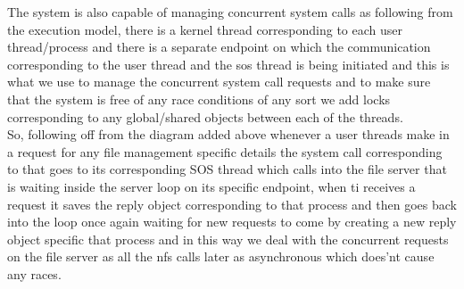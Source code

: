 \noindent The system is also capable of managing concurrent system calls as following from the execution model,
there is a kernel thread corresponding to each user thread/process and there is a separate endpoint on which 
the communication corresponding to the user thread and the sos thread is being initiated and this is what we use to 
manage the concurrent system call requests and to make sure that the system is free of any race conditions of any sort we 
add locks corresponding to any global/shared objects between each of the threads. \\
So, following off from the diagram added above whenever a user threads make in a request for any file management specific details the system call corresponding to that goes to its corresponding 
SOS thread which calls into the file server that is waiting inside the server loop on its specific endpoint, when ti receives a request it saves the reply object corresponding to that process and then goes back into the loop once again waiting for new 
requests to come by creating a new reply object specific that process and in this way we deal with the concurrent requests on the file server as all the nfs calls later as asynchronous which does'nt cause any races. 







